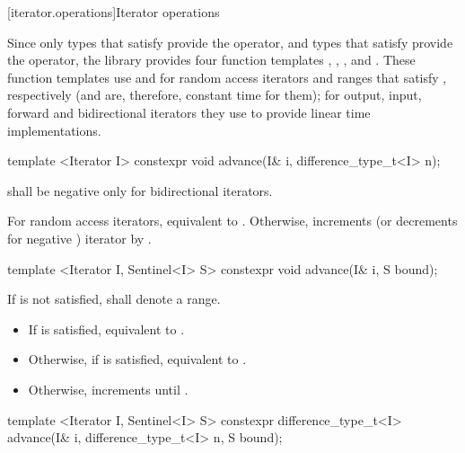 [iterator.operations]{Iterator operations}

\pnum
Since only types that satisfy
 provide the \tcode{+} operator, and
types that satisfy  provide the \tcode{-}
operator, the library provides four function templates
, , , and .
These
function templates
use
\tcode{+}
and
\tcode{-}
for random access iterators and ranges that satisfy , respectively (and are, therefore, constant
time for them); for output, input, forward and bidirectional iterators they use
\tcode{++}
to provide linear time
implementations.

%
\begin{itemdecl}
template <Iterator I>
  constexpr void advance(I& i, difference_type_t<I> n);
\end{itemdecl}

\begin{itemdescr}
\pnum
\requires
{}
shall be negative only for bidirectional iterators.

\pnum
\effects
For random access iterators, equivalent to .
Otherwise, increments (or decrements for negative
)
iterator
by
.
\end{itemdescr}

\begin{itemdecl}
template <Iterator I, Sentinel<I> S>
  constexpr void advance(I& i, S bound);
\end{itemdecl}

\begin{itemdescr}
\pnum
\requires
If
 is not satisfied, 
shall denote a range.

\pnum
\effects
\begin{itemize}
\item If  is satisfied,
      equivalent to .

\item Otherwise, if
       is satisfied, equivalent to .

\item Otherwise, increments  until .
\end{itemize}
\end{itemdescr}

\begin{itemdecl}
template <Iterator I, Sentinel<I> S>
  constexpr difference_type_t<I> advance(I& i, difference_type_t<I> n, S bound);
\end{itemdecl}


